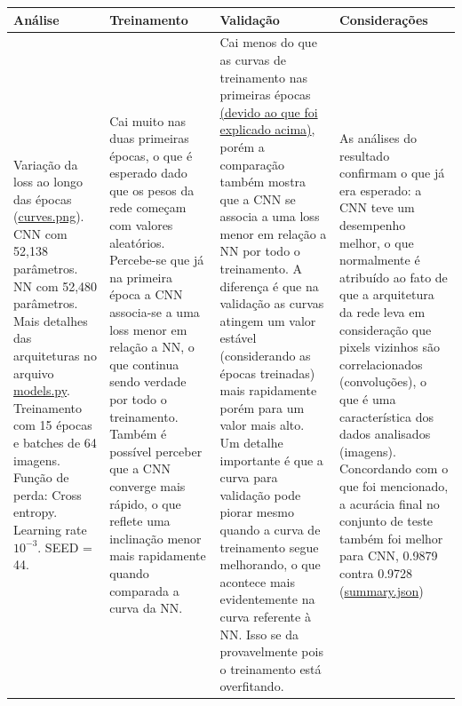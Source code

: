 \documentclass[11pt,a4paper]{article}
\begin{document}
\begin{table}[H]
\centering
\begin{tabular}{>{\raggedright\arraybackslash}p{} >{\raggedright\arraybackslash}p{} >{\raggedright\arraybackslash}p{} >{\raggedright\arraybackslash}p{}}
\toprule
\textbf{Análise} & \textbf{Treinamento} & \textbf{Validação} & \textbf{Considerações} \\
\midrule
Variação da loss ao longo das épocas (\href{https://github.com/deconr/MAC5921-DeepLearning/blob/main/ep1/results/baseline/curves.png}{curves.png}). \newline \newline CNN com 52,138 parâmetros. \newline \newline NN com 52,480 parâmetros. \newline \newline Mais detalhes das arquiteturas no arquivo \href{https://github.com/deconr/MAC5921-DeepLearning/blob/main/ep1/models.py}{models.py}. \newline \newline Treinamento com 15 épocas e batches de 64 imagens. \newline \newline Função de perda: Cross entropy. \newline \newline Learning rate $10^{-3}$. \newline \newline SEED = 44. & Cai muito nas duas primeiras épocas, o que é esperado dado que os pesos da rede começam com valores aleatórios. Percebe-se que já na primeira época a CNN associa-se a uma loss menor em relação a NN, o que continua sendo verdade por todo o treinamento. Também é possível perceber que a CNN converge mais rápido, o que reflete uma inclinação menor mais rapidamente quando comparada a curva da NN. & Cai menos do que as curvas de treinamento nas primeiras épocas \hyperlink{explicacao-dinamica-loss}{(devido ao que foi explicado acima)}, porém a comparação também mostra que a CNN se associa a uma loss menor em relação a NN por todo o treinamento. A diferença é que na validação as curvas atingem um valor estável (considerando as épocas treinadas) mais rapidamente porém para um valor mais alto. Um detalhe importante é que a curva para validação pode piorar mesmo quando a curva de treinamento segue melhorando, o que acontece mais evidentemente na curva referente à NN. Isso se da provavelmente pois o treinamento está overfitando.  & As análises do resultado confirmam o que já era esperado: a CNN teve um desempenho melhor, o que normalmente é atribuído ao fato de que a arquitetura da rede leva em consideração que pixels vizinhos são correlacionados (convoluções), o que é uma característica dos dados analisados (imagens). Concordando com o que foi mencionado, a acurácia final no conjunto de teste também foi melhor para CNN, 0.9879 contra 0.9728 (\href{https://github.com/deconr/MAC5921-DeepLearning/blob/main/ep1/results/baseline/summary.json}{summary.json})\\
\bottomrule
\end{tabular}
\end{table}
\end{document}
